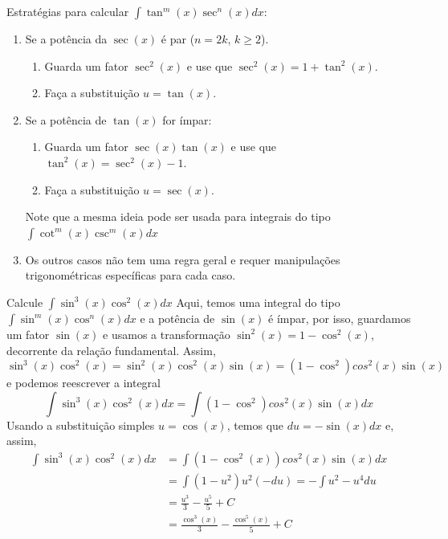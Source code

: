 Estratégias para calcular \(\int \tan^m(x) \sec^n(x)dx\):
\begin{enumerate}
  \item Se a potência da $\sec(x)$ é par ($n=2k$, $k \geq 2$).
        \begin{enumerate}
          \item Guarda um fator $\sec^2(x)$ e use que $\sec^2(x)=1+\tan^2(x)$.
          \item Faça a substituição $u=\tan(x)$.
        \end{enumerate}

  \item Se a potência de $\tan(x)$ for ímpar:
        \begin{enumerate}
          \item Guarda um fator $\sec(x)\tan(x)$ e use que $\tan^2(x)=\sec^2(x)-1$.
          \item Faça a substituição $u=\sec(x)$.
        \end{enumerate}
        Note que a mesma ideia pode ser usada para integrais do tipo
        \(\int \cot^m(x) \csc^m(x)dx\)

  \item Os outros casos não tem uma regra geral e requer manipulações
        trigonométricas específicas para cada caso.
\end{enumerate}

\begin{example}
  Calcule \(\int \sin^3(x)\cos^2(x)dx\)
  \solution
  Aqui, temos uma integral do tipo
  $\int \sin^m(x) \cos^n(x)dx$ e a potência de $\sin(x)$ é ímpar,
  por isso, guardamos um fator $\sin(x)$ e usamos a transformação
  $\sin^2(x)= 1- \cos^2(x)$, decorrente da relação fundamental. Assim,
  \[
    \sin^3(x)\cos^2(x)= \sin^2(x)\cos^2(x)\sin(x)= (1-\cos^2)cos^2(x)\sin(x)
  \]
  e podemos reescrever a integral
  \[
    \int \sin^3(x)\cos^2(x)dx=\int  (1-\cos^2)cos^2(x)\sin(x) dx
  \]
  Usando a substituição simples $u= \cos(x)$, temos que $du=-\sin(x)dx$ e, assim,
  \begin{align*}
    \int \sin^3(x)\cos^2(x)dx
    & = \int  (1-\cos^2(x))cos^2(x)\sin(x) dx \\
    & = \int (1-u^2)u^2(-du)=- \int u^2-u^4 du \\
    & = \frac{u^3}{3}- \frac{u^5}{5}+C \\
    & = \frac{\cos^3(x)}{3}- \frac{\cos^5(x)}{5}+C
  \end{align*}
\end{example}

